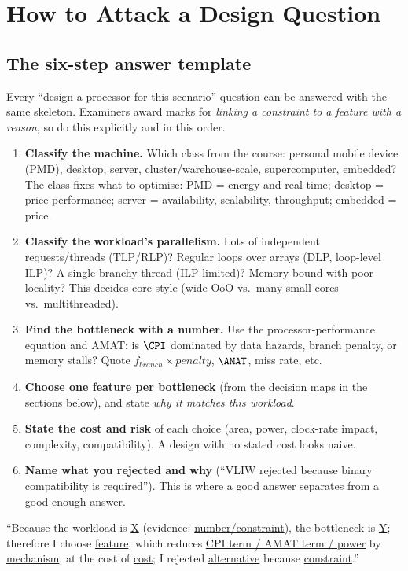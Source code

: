 \section{How to Attack a Design Question}\label{ch:method}

\subsection{The six-step answer template}
Every ``design a processor for this scenario'' question can be answered with the same skeleton. Examiners award marks for \emph{linking a constraint to a feature with a reason}, so do this explicitly and in this order.

\begin{enumerate}[leftmargin=*]
\item \textbf{Classify the machine.} Which class from the course: personal mobile device (PMD), desktop, server, cluster/warehouse-scale, supercomputer, embedded? The class fixes what to optimise: PMD = energy and real-time; desktop = price-performance; server = availability, scalability, throughput; embedded = price.
\item \textbf{Classify the workload's parallelism.} Lots of independent requests/threads (TLP/RLP)? Regular loops over arrays (DLP, loop-level ILP)? A single branchy thread (ILP-limited)? Memory-bound with poor locality? This decides core style (wide OoO vs.\ many small cores vs.\ multithreaded).
\item \textbf{Find the bottleneck with a number.} Use the processor-performance equation and AMAT: is $\CPI$ dominated by data hazards, branch penalty, or memory stalls? Quote $f_{branch}\times penalty$, $\AMAT$, miss rate, etc.
\item \textbf{Choose one feature per bottleneck} (from the decision maps in the sections below), and state \emph{why it matches this workload}.
\item \textbf{State the cost and risk} of each choice (area, power, clock-rate impact, complexity, compatibility). A design with no stated cost looks naive.
\item \textbf{Name what you rejected and why} (``VLIW rejected because binary compatibility is required''). This is where a good answer separates from a good-enough answer.
\end{enumerate}

\begin{key}
``Because the workload is \underline{X} (evidence: \underline{number/constraint}), the bottleneck is \underline{Y}; therefore I choose \underline{feature}, which reduces \underline{CPI term / AMAT term / power} by \underline{mechanism}, at the cost of \underline{cost}; I rejected \underline{alternative} because \underline{constraint}.''
\end{key}

